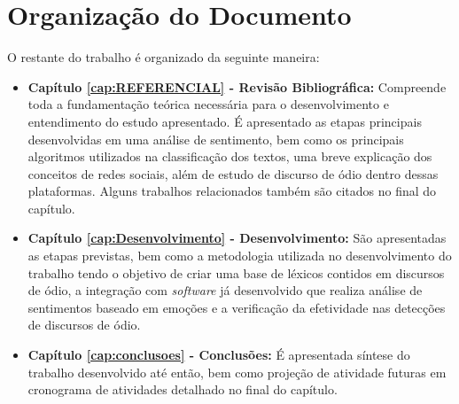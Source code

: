 \section{Organização do Documento}
O restante do trabalho é organizado da seguinte maneira:

\begin{itemize}

\item \textbf{Capítulo \ref{cap:REFERENCIAL} - Revisão Bibliográfica:} Compreende toda a fundamentação teórica necessária para o desenvolvimento e entendimento do estudo apresentado. É apresentado as etapas principais desenvolvidas em uma análise de sentimento, bem como os principais algoritmos utilizados na classificação dos textos, uma breve explicação dos conceitos de redes sociais, além de estudo de discurso de ódio dentro dessas plataformas. Alguns trabalhos relacionados também são citados no final do capítulo.

\item \textbf{Capítulo \ref{cap:Desenvolvimento} - Desenvolvimento:} São apresentadas as etapas previstas, bem como a metodologia utilizada no desenvolvimento do trabalho tendo o objetivo de criar uma base de léxicos contidos em discursos de ódio, a integração com \textit{software} já desenvolvido que realiza análise de sentimentos baseado em emoções e a verificação da efetividade nas detecções de discursos de ódio.

\item \textbf{Capítulo \ref{cap:conclusoes} - Conclusões:} É apresentada síntese do trabalho desenvolvido até então, bem como projeção de atividade futuras em cronograma de atividades detalhado no final do capítulo.
\end{itemize}
